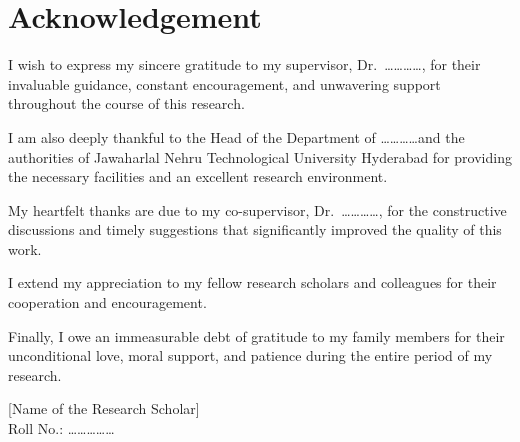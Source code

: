 \chapter*{Acknowledgement}
\thispagestyle{plain}

I wish to express my sincere gratitude to my supervisor,
Dr.\ \ldots\ldots\ldots\ldots, for their invaluable guidance, constant
encouragement, and unwavering support throughout the course of this
research.

I am also deeply thankful to the Head of the Department of
\ldots\ldots\ldots\ldots and the authorities of Jawaharlal Nehru
Technological University Hyderabad for providing the necessary
facilities and an excellent research environment.

My heartfelt thanks are due to my co-supervisor, Dr.\
\ldots\ldots\ldots\ldots, for the constructive discussions and timely
suggestions that significantly improved the quality of this work.

I extend my appreciation to my fellow research scholars and colleagues
for their cooperation and encouragement.

Finally, I owe an immeasurable debt of gratitude to my family members
for their unconditional love, moral support, and patience during the
entire period of my research.

\vspace{2cm}

\noindent
\hfill [Name of the Research Scholar]\\
\hfill Roll No.: \ldots\ldots\ldots\ldots\ldots

\newpage
